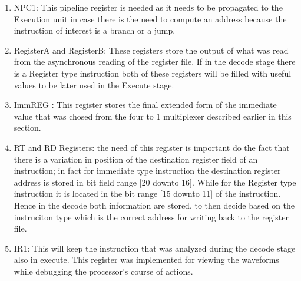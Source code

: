     \begin{enumerate}

        \item NPC1: This pipeline register is needed as it needs to be propagated to the Execution unit in case there is the need to compute an address 
        because the instruction of interest is a branch or a jump.
        \item RegisterA and RegisterB: These registers store the output of what was read from the asynchronous reading of the register file. If in the decode
        stage there is a Register type instruction both of these registers will be filled with useful values to be later used in the Execute stage.
        \item ImmREG : This register stores the final extended form of the immediate value that was chosed from the four to 1 multiplexer described earlier in this section.
        \item RT and RD Registers: the need of this register is important do the fact that there is a variation  in position of the destination register field of an instruction;
        in fact for immediate type instruction the destination register address is stored in bit field range [20 downto 16]. While for the Register type instruction it is located
        in the bit range [15 downto 11] of the instruction. Hence in the decode both information are stored, to then decide based on the instruciton type which is the correct address
        for writing back to the register file.
        \item IR1: This will keep the instruction that was analyzed during the decode stage also in execute. This register was implemented for viewing the waveforms
        while debugging the processor's course of actions.

        \end{enumerate}
    